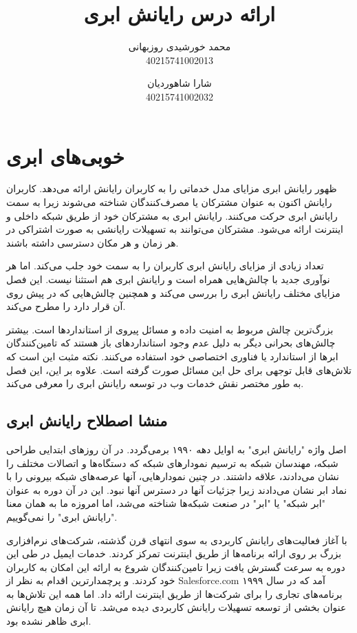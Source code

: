 \documentclass{book}
\title{ارائه درس رایانش ابری}
\author{محمد خورشیدی روزبهانی\\40215741002013 \and شارا شاهوردیان\\40215741002032}
\date{}
\begin{document}
    \maketitle

    \tableofcontents

    \newpage

    \chapter{خوبی‌های ابری}

        ظهور رایانش ابری مزایای مدل خدماتی را به کاربران رایانش ارائه می‌دهد. کاربران رایانش اکنون به عنوان مشترکان یا مصرف‌کنندگان شناخته می‌شوند زیرا به سمت رایانش ابری حرکت می‌کنند. رایانش ابری به مشترکان خود از طریق شبکه داخلی و اینترنت ارائه می‌شود. مشترکان می‌توانند به تسهیلات رایانشی به صورت اشتراکی در هر زمان و هر مکان دسترسی داشته باشند.

        تعداد زیادی از مزایای رایانش ابری کاربران را به سمت خود جلب می‌کند. اما هر نوآوری جدید با چالش‌هایی همراه است و رایانش ابری هم استثنا نیست. این فصل مزایای مختلف رایانش ابری را بررسی می‌کند و همچنین چالش‌هایی که در پیش روی آن قرار دارد را مطرح می‌کند.
    
        بزرگ‌ترین چالش مربوط به امنیت داده و مسائل پیروی از استانداردها است. بیشتر چالش‌های بحرانی دیگر به دلیل عدم وجود استانداردهای باز هستند که تامین‌کنندگان ابرها از استاندارد یا فناوری اختصاصی خود استفاده می‌کنند. نکته مثبت این است که تلاش‌های قابل توجهی برای حل این مسائل صورت گرفته است. علاوه بر این، این فصل به طور مختصر نقش خدمات وب در توسعه رایانش ابری را 
        معرفی می‌کند.

        \section{منشا اصطلاح رایانش ابری}

            اصل واژه "رایانش ابری" به اوایل دهه ۱۹۹۰ برمی‌گردد. در آن روزهای ابتدایی طراحی شبکه، مهندسان شبکه به ترسیم نمودارهای شبکه که دستگاه‌ها و اتصالات مختلف را نشان می‌دادند، علاقه داشتند. در چنین نمودارهایی، آنها عرصه‌های شبکه بیرونی را با نماد ابر نشان می‌دادند زیرا جزئیات آنها در دسترس آنها نبود. این در آن دوره به عنوان "ابر شبکه" یا "ابر" در صنعت شبکه‌ها شناخته می‌شد، اما امروزه ما به همان معنا "رایانش ابری" را نمی‌گوییم.

            با آغاز فعالیت‌های رایانش کاربردی به سوی انتهای قرن گذشته، شرکت‌های نرم‌افزاری بزرگ بر روی ارائه برنامه‌ها از طریق اینترنت تمرکز کردند. خدمات ایمیل در طی این دوره به سرعت گسترش یافت زیرا تامین‌کنندگان شروع به ارائه این امکان به کاربران خود کردند. و پرچمدارترین اقدام به نظر از Salesforce.com آمد که در سال ۱۹۹۹ برنامه‌های تجاری را برای شرکت‌ها از طریق اینترنت ارائه داد. اما همه این تلاش‌ها به عنوان بخشی از توسعه تسهیلات رایانش کاربردی دیده می‌شد. تا آن زمان هیچ رایانش ابری ظاهر نشده بود.
\end{document}
